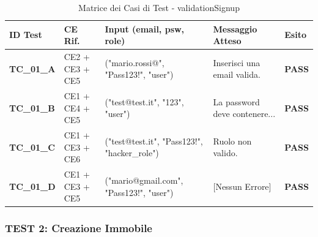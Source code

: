 \documentclass{article}
\begin{document}
\begin{table}[H]
    \centering
    \caption{Matrice dei Casi di Test - validationSignup}
    \begin{tabularx}{\textwidth}{|l|l|X|l|l|}
        \hline
        \rowcolor{DarkBlue}
        \textbf{\color{white}ID Test} & \textbf{\color{white}CE Rif.} & \textbf{\color{white}Input (email, psw, role)} & \textbf{\color{white}Messaggio Atteso} & \textbf{\color{white}Esito}      \\ \hline
        \textbf{TC\_01\_A}            & CE2 + CE3 + CE5               & ("mario.rossi@", "Pass123!", "user")           & Inserisci una email valida.            & {\color{codegreen}\textbf{PASS}} \\ \hline
        \textbf{TC\_01\_B}            & CE1 + CE4 + CE5               & ("test@test.it", "123", "user")                & La password deve contenere...          & {\color{codegreen}\textbf{PASS}} \\ \hline
        \textbf{TC\_01\_C}            & CE1 + CE3 + CE6               & ("test@test.it", "Pass123!", "hacker\_role")   & Ruolo non valido.                      & {\color{codegreen}\textbf{PASS}} \\ \hline
        \textbf{TC\_01\_D}            & CE1 + CE3 + CE5               & ("mario@gmail.com", "Pass123!", "user")        & [Nessun Errore]                        & {\color{codegreen}\textbf{PASS}} \\ \hline
    \end{tabularx}
\end{table}

\newpage
\subsubsection{TEST 2: Creazione Immobile}
\end{document}
